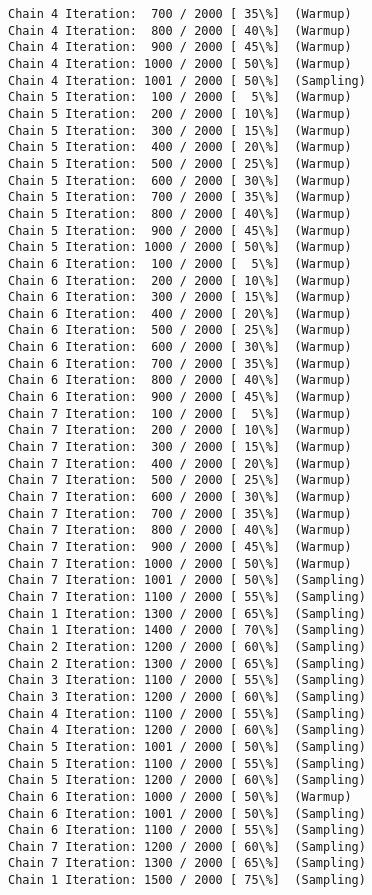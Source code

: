 \documentclass[11pt]{article}
\begin{document}
\begin{Verbatim}[commandchars=\\\{\}]
Chain 4 Iteration:  700 / 2000 [ 35\%]  (Warmup)
Chain 4 Iteration:  800 / 2000 [ 40\%]  (Warmup)
Chain 4 Iteration:  900 / 2000 [ 45\%]  (Warmup)
Chain 4 Iteration: 1000 / 2000 [ 50\%]  (Warmup)
Chain 4 Iteration: 1001 / 2000 [ 50\%]  (Sampling)
Chain 5 Iteration:  100 / 2000 [  5\%]  (Warmup)
Chain 5 Iteration:  200 / 2000 [ 10\%]  (Warmup)
Chain 5 Iteration:  300 / 2000 [ 15\%]  (Warmup)
Chain 5 Iteration:  400 / 2000 [ 20\%]  (Warmup)
Chain 5 Iteration:  500 / 2000 [ 25\%]  (Warmup)
Chain 5 Iteration:  600 / 2000 [ 30\%]  (Warmup)
Chain 5 Iteration:  700 / 2000 [ 35\%]  (Warmup)
Chain 5 Iteration:  800 / 2000 [ 40\%]  (Warmup)
Chain 5 Iteration:  900 / 2000 [ 45\%]  (Warmup)
Chain 5 Iteration: 1000 / 2000 [ 50\%]  (Warmup)
Chain 6 Iteration:  100 / 2000 [  5\%]  (Warmup)
Chain 6 Iteration:  200 / 2000 [ 10\%]  (Warmup)
Chain 6 Iteration:  300 / 2000 [ 15\%]  (Warmup)
Chain 6 Iteration:  400 / 2000 [ 20\%]  (Warmup)
Chain 6 Iteration:  500 / 2000 [ 25\%]  (Warmup)
Chain 6 Iteration:  600 / 2000 [ 30\%]  (Warmup)
Chain 6 Iteration:  700 / 2000 [ 35\%]  (Warmup)
Chain 6 Iteration:  800 / 2000 [ 40\%]  (Warmup)
Chain 6 Iteration:  900 / 2000 [ 45\%]  (Warmup)
Chain 7 Iteration:  100 / 2000 [  5\%]  (Warmup)
Chain 7 Iteration:  200 / 2000 [ 10\%]  (Warmup)
Chain 7 Iteration:  300 / 2000 [ 15\%]  (Warmup)
Chain 7 Iteration:  400 / 2000 [ 20\%]  (Warmup)
Chain 7 Iteration:  500 / 2000 [ 25\%]  (Warmup)
Chain 7 Iteration:  600 / 2000 [ 30\%]  (Warmup)
Chain 7 Iteration:  700 / 2000 [ 35\%]  (Warmup)
Chain 7 Iteration:  800 / 2000 [ 40\%]  (Warmup)
Chain 7 Iteration:  900 / 2000 [ 45\%]  (Warmup)
Chain 7 Iteration: 1000 / 2000 [ 50\%]  (Warmup)
Chain 7 Iteration: 1001 / 2000 [ 50\%]  (Sampling)
Chain 7 Iteration: 1100 / 2000 [ 55\%]  (Sampling)
Chain 1 Iteration: 1300 / 2000 [ 65\%]  (Sampling)
Chain 1 Iteration: 1400 / 2000 [ 70\%]  (Sampling)
Chain 2 Iteration: 1200 / 2000 [ 60\%]  (Sampling)
Chain 2 Iteration: 1300 / 2000 [ 65\%]  (Sampling)
Chain 3 Iteration: 1100 / 2000 [ 55\%]  (Sampling)
Chain 3 Iteration: 1200 / 2000 [ 60\%]  (Sampling)
Chain 4 Iteration: 1100 / 2000 [ 55\%]  (Sampling)
Chain 4 Iteration: 1200 / 2000 [ 60\%]  (Sampling)
Chain 5 Iteration: 1001 / 2000 [ 50\%]  (Sampling)
Chain 5 Iteration: 1100 / 2000 [ 55\%]  (Sampling)
Chain 5 Iteration: 1200 / 2000 [ 60\%]  (Sampling)
Chain 6 Iteration: 1000 / 2000 [ 50\%]  (Warmup)
Chain 6 Iteration: 1001 / 2000 [ 50\%]  (Sampling)
Chain 6 Iteration: 1100 / 2000 [ 55\%]  (Sampling)
Chain 7 Iteration: 1200 / 2000 [ 60\%]  (Sampling)
Chain 7 Iteration: 1300 / 2000 [ 65\%]  (Sampling)
Chain 1 Iteration: 1500 / 2000 [ 75\%]  (Sampling)

\end{Verbatim}
\end{document}
